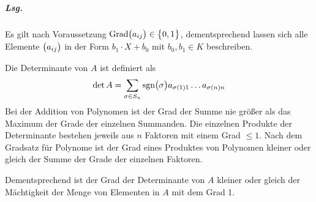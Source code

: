 \documentclass{scrreprt}
\newcommand{\Grad}{\text{Grad}}
\begin{document}
\subparagraph{Lsg.}
Es gilt nach Voraussetzung
$\Grad\qty\big(a_{ij}) \in \qty\big{0, 1}$, dementsprechend lassen sich alle
Elemente $\qty\big(a_{ij})$ in der Form $b_1 \cdot X + b_0$ mit $b_0, b_1 \in K$
beschreiben.

Die Determinante von $A$ ist definiert als
\[
  \det A = \sum_{\sigma \in S_n}
  \text{sgn}\qty\big(\sigma) a_{\sigma(1)1} \ldots a_{\sigma(n)n}
\]
Bei der Addition von Polynomen ist der Grad der Summe nie größer als das
Maximum der Grade der einzelnen Summanden.
Die einzelnen Produkte der Determinante bestehen jeweils aus $n$ Faktoren mit
einem Grad $\leq 1$.
Nach dem Gradsatz für Polynome ist der Grad eines Produktes von Polynomen kleiner
oder gleich der Summe der Grade der einzelnen Faktoren.

Dementsprechend ist der Grad der Determinante von $A$ kleiner oder gleich der
Mächtigkeit der Menge von Elementen in $A$ mit dem Grad 1.
\end{document}
